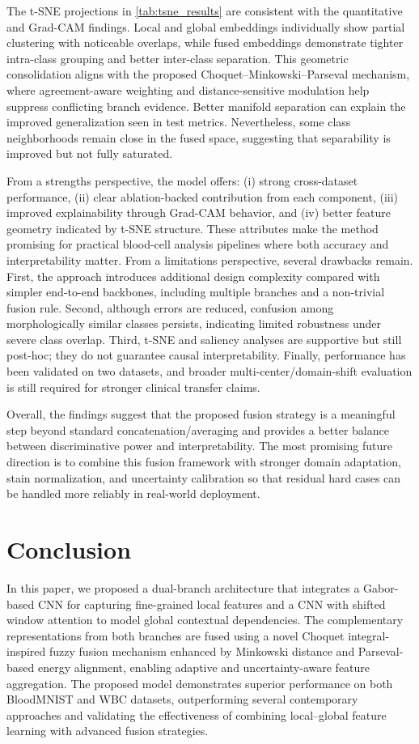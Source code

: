 \documentclass[preprint,12pt]{elsarticle}
\begin{document}
The t-SNE projections in \autoref{tab:tsne_results} are consistent with the quantitative and Grad-CAM findings. Local and global embeddings individually show partial clustering with noticeable overlaps, while fused embeddings demonstrate tighter intra-class grouping and better inter-class separation. This geometric consolidation aligns with the proposed Choquet--Minkowski--Parseval mechanism, where agreement-aware weighting and distance-sensitive modulation help suppress conflicting branch evidence. Better manifold separation can explain the improved generalization seen in test metrics. Nevertheless, some class neighborhoods remain close in the fused space, suggesting that separability is improved but not fully saturated.

From a strengths perspective, the model offers: (i) strong cross-dataset performance, (ii) clear ablation-backed contribution from each component, (iii) improved explainability through Grad-CAM behavior, and (iv) better feature geometry indicated by t-SNE structure. These attributes make the method promising for practical blood-cell analysis pipelines where both accuracy and interpretability matter. From a limitations perspective, several drawbacks remain. First, the approach introduces additional design complexity compared with simpler end-to-end backbones, including multiple branches and a non-trivial fusion rule. Second, although errors are reduced, confusion among morphologically similar classes persists, indicating limited robustness under severe class overlap. Third, t-SNE and saliency analyses are supportive but still post-hoc; they do not guarantee causal interpretability. Finally, performance has been validated on two datasets, and broader multi-center/domain-shift evaluation is still required for stronger clinical transfer claims.

Overall, the findings suggest that the proposed fusion strategy is a meaningful step beyond standard concatenation/averaging and provides a better balance between discriminative power and interpretability. The most promising future direction is to combine this fusion framework with stronger domain adaptation, stain normalization, and uncertainty calibration so that residual hard cases can be handled more reliably in real-world deployment.

 \section{Conclusion}
In this paper, we proposed a dual-branch architecture that integrates a Gabor-based CNN for capturing fine-grained local features and a CNN with shifted window attention to model global contextual dependencies. The complementary representations from both branches are fused using a novel Choquet integral-inspired fuzzy fusion mechanism enhanced by Minkowski distance and Parseval-based energy alignment, enabling adaptive and uncertainty-aware feature aggregation. The proposed model demonstrates superior performance on both BloodMNIST and WBC datasets, outperforming several contemporary approaches and validating the effectiveness of combining local–global feature learning with advanced fusion strategies.
\end{document}
